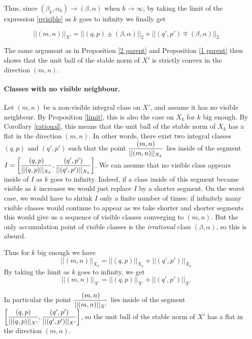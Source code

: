 \documentclass{article}
\theoremstyle{definition}
\begin{document}
 
 Thus, since $(\beta_k,\alpha_k) \longrightarrow (\beta,\alpha)$ when $k\rightarrow\infty$, by taking the limit of the expression \ref{pvisible} as $k$ goes to infinity we finally get

$$||(m,n)||_{X'} = ||(q,p) \pm (\beta,\alpha)||_2 + || (q',p') \mp (\beta,\alpha)||_2$$

The same argument as in Proposition  \ref{2 parent} and Proposition \ref{1 parent} then shows that the unit ball of the stable norm of $X'$ is strictly convex in the direction $(m,n)$.


\paragraph{Classes with no visible neighbour.}

Let $(m,n)$ be a non-visible integral class on $X'$, and assume it has no visible neighbour. By Proposition \ref{limit}, this is also the case on $X_k$ for $k$ big enough. By Corollary \ref{rational}, this means that the unit ball of the stable norm of $X_k$ has a flat in the direction $(m,n)$. In other words, there exist two integral classes $(q,p)$ and $(q',p')$ such that the point $\mathlarger{\frac{(m,n)}{||(m,n)||_{X_k}}}$ lies inside of the segment $I = \left [\mathlarger{\frac{(q,p)}{||(q,p)||_{X_k}}} , \mathlarger{\frac{(q',p')}{||(q',p')||_{X_k}}} \right ]$. We can assume that no visible class appears inside of $I$ as $k$ goes to infinity. Indeed, if a class inside of this segment became visible as $k$ increases we would just replace $I$ by a shorter segment. On the worst case, we would have to shrink $I$ only a finite number of times: if infinitely many visible classes would continue to appear as we take shorter and shorter segments this would give us a sequence of visible classes converging to $(m,n)$. But the only accumulation point of visible classes is the \emph{irrational} class $(\beta,\alpha)$, so this is absurd. \newline

Thus for $k$ big enough we have 
$$||(m,n)||_{X_k} = ||(q,p)||_{X_k}+ ||(q',p')||_{X_k}$$
By taking the limit as $k$ goes to infinity, we get
$$||(m,n)||_{X'} = ||(q,p)||_{X'}+ ||(q',p')||_{X'}$$

In particular the point $\mathlarger{\frac{(m,n)}{||(m,n)||_{X'}}}$ lies inside of the segment $ \left [\mathlarger{\frac{(q,p)}{||(q,p)||_{X'}}}, \mathlarger{\frac{(q',p')}{||(q',p')||_{X'}}} \right ]$, so the unit ball of the stable norm of $X'$ has a flat in the direction $(m,n)$. \newline \newline 
\end{document}
